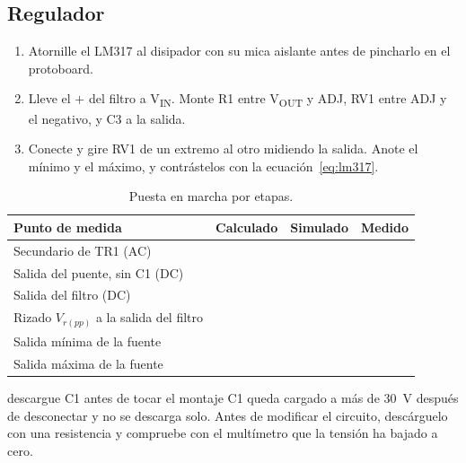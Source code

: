 \documentclass[11pt,a4paper]{article}
\begin{document}
\subsection{Regulador}
\begin{enumerate}[label=\textbf{Paso \arabic*.}, leftmargin=*, labelsep=0.6em, start=9]
\item Atornille el LM317 al disipador con su mica aislante antes de pincharlo en el
protoboard.
\item Lleve el $+$ del filtro a V\textsubscript{IN}. Monte R1 entre V\textsubscript{OUT} y
ADJ, RV1 entre ADJ y el negativo, y C3 a la salida.
\item Conecte y gire RV1 de un extremo al otro midiendo la salida. Anote el mínimo y el
máximo, y contrástelos con la ecuación~\eqref{eq:lm317}.
\end{enumerate}

\begin{table}[H]
  \centering
  \caption{Puesta en marcha por etapas.}
  \label{tab:puesta-marcha}
  \small
  \renewcommand{\arraystretch}{2.3}
  \begin{tabularx}{\linewidth}{@{}|>{\raggedright\arraybackslash}X
                                 |>{\centering\arraybackslash}m{2.5cm}
                                 |>{\centering\arraybackslash}m{2.5cm}
                                 |>{\centering\arraybackslash}m{2.5cm}|@{}}
    \hline
    \textbf{Punto de medida} & \textbf{Calculado} & \textbf{Simulado} & \textbf{Medido}\\
    \hline
    Secundario de TR1 (AC)                    & & & \\ \hline
    Salida del puente, sin C1 (DC)            & & & \\ \hline
    Salida del filtro (DC)                    & & & \\ \hline
    Rizado $V_{r(pp)}$ a la salida del filtro & & & \\ \hline
    Salida mínima de la fuente                & & & \\ \hline
    Salida máxima de la fuente                & & & \\ \hline
  \end{tabularx}
\end{table}

\begin{seguridad}{descargue C1 antes de tocar el montaje}
C1 queda cargado a más de \qty{30}{\volt} después de desconectar y no se descarga solo.
Antes de modificar el circuito, descárguelo con una resistencia y compruebe con el
multímetro que la tensión ha bajado a cero.
\end{seguridad}
\end{document}
